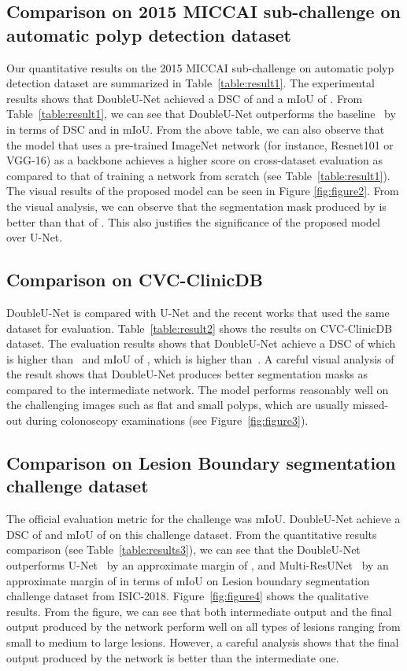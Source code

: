 \documentclass[conference]{IEEEtran}
\begin{document}
\subsection{Comparison on 2015 MICCAI sub-challenge on automatic polyp detection dataset}
Our quantitative results on the 2015 MICCAI sub-challenge on automatic polyp detection dataset are summarized in Table~\ref{table:result1}.  The experimental results shows that DoubleU-Net achieved a DSC of  and a \ac{mIoU} of . From  Table~\ref{table:result1}, we can see that DoubleU-Net outperforms the baseline~\cite{qadir2019polyp} by  in terms of DSC and  in \ac{mIoU}. From the above table, we can also observe that the model that uses a pre-trained ImageNet network (for instance, Resnet101 or VGG-16) as a backbone achieves a higher score on cross-dataset evaluation as compared to that of training a network from scratch (see Table~\ref{table:result1}). The visual results of the proposed model can be seen in Figure \ref{fig:figure2}. From the visual analysis, we can observe that the segmentation mask produced by  is better than that of . This also justifies the significance of the proposed model over U-Net. 

\subsection{Comparison on CVC-ClinicDB}
DoubleU-Net is compared with U-Net and the recent works that used the same dataset for evaluation. Table~\ref{table:result2} shows the results on CVC-ClinicDB dataset. The evaluation results shows that DoubleU-Net achieve a DSC of  which is  higher than~\cite{poomeshwaran2019polyp} and \ac{mIoU} of , which is  higher than~\cite{ibtehaz2020multiresunet}. A careful visual analysis of the result shows that DoubleU-Net produces better segmentation masks as compared to the intermediate network. The model performs reasonably well on the challenging images such as flat and small polyps, which are usually missed-out during colonoscopy examinations (see Figure~\ref{fig:figure3}). 




\subsection{Comparison on Lesion Boundary segmentation challenge dataset}
The official evaluation metric for the challenge was \ac{mIoU}. DoubleU-Net achieve a DSC of  and \ac{mIoU} of  on this challenge dataset. From the quantitative results comparison (see Table~\ref{table:results3}), we can see that the DoubleU-Net outperforms U-Net~\cite{ibtehaz2020multiresunet} by an approximate margin of , and Multi-ResUNet~\cite{ibtehaz2020multiresunet} by an approximate margin of  in terms of \ac{mIoU} on Lesion boundary segmentation challenge dataset from ISIC-2018. Figure~\ref{fig:figure4} shows the qualitative results. From the figure, we can see that both intermediate output and the final output produced by the network perform well on all types of lesions ranging from small to medium to large lesions. However, a careful analysis shows that the final output produced by the network is better than the intermediate one.  
\end{document}
